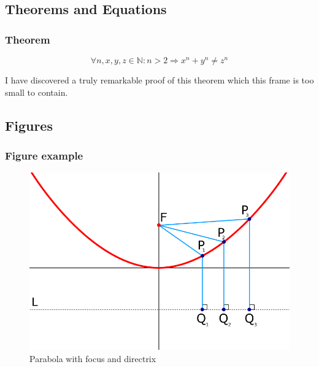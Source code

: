 \documentclass[aspectratio=169]{beamer}
\begin{document}
\subsection{Theorems and Equations}


\begin{frame}
\frametitle{Theorem}
\begin{theorem}
\begin{equation}
    \forall n, x, y, z \in \mathbb{N}: n > 2 \Rightarrow x^n + y^n \neq z^n
\end{equation}
\end{theorem}
I have discovered a truly remarkable proof of this theorem which this frame is too small to contain.
\end{frame}


\subsection{Figures}

\begin{frame}
\frametitle{Figure example}
\begin{figure}
    \includegraphics[scale=.3]{fig/parabola.png}
    \caption{Parabola with focus and directrix}
\end{figure}
\end{frame}


\begin{frame}[plain]
\end{frame}

\end{document}

